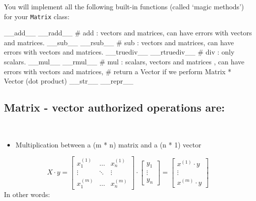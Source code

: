 \documentclass[]{article}
\newenvironment{Shaded}{\begin{snugshade}}{\end{snugshade}}
\newcommand{\CommentTok}[1]{\textcolor[rgb]{0.48,0.49,0.49}{#1}}
\newcommand{\FunctionTok}[1]{\textcolor[rgb]{0.56,0.27,0.68}{#1}}
\providecommand{\tightlist}{%
  \setlength{\itemsep}{0pt}\setlength{\parskip}{0pt}}
\begin{document}
You will implement all the following built-in functions (called `magic
methods') for your \texttt{Matrix} class:

\begin{Shaded}
\begin{Highlighting}[]
    \FunctionTok{__add__}
    \FunctionTok{__radd__}
    \CommentTok{# add : vectors and matrices, can have errors with vectors and matrices.}
    \FunctionTok{__sub__}
    \FunctionTok{__rsub__}
    \CommentTok{# sub : vectors and matrices, can have errors with vectors and matrices.}
    \FunctionTok{__truediv__}
    \FunctionTok{__rtruediv__}
    \CommentTok{# div : only scalars.}
    \FunctionTok{__mul__}
    \FunctionTok{__rmul__}
    \CommentTok{# mul : scalars, vectors and matrices , can have errors with vectors and matrices, }
    \CommentTok{# return a Vector if we perform Matrix * Vector (dot product)}
    \FunctionTok{__str__}
    \FunctionTok{__repr__}
\end{Highlighting}
\end{Shaded}

\hypertarget{matrix---vector-authorized-operations-are}{%
\subsection{Matrix - vector authorized operations
are:}\label{matrix---vector-authorized-operations-are}}

​

\begin{itemize}
\tightlist
\item
  Multiplication between a (m * n) matrix and a (n * 1) vector
\end{itemize}

\large

\[
X \cdot y = 
\begin{bmatrix} x^{(1)}_1 & \dots& x^{(1)}_n \\ 
\vdots & \ddots & \vdots \\ 
x^{(m)}_1 & \dots & x^{(m)}_n
\end{bmatrix} 
\cdot 
\begin{bmatrix} 
y_1 \\
\vdots \\ 
y_n 
\end{bmatrix} 
= 
\begin{bmatrix} x^{(1)} \cdot y \\ \vdots  \\ x^{(m)} \cdot y \end{bmatrix}
\] \normalsize ​ In other words:
\end{document}

